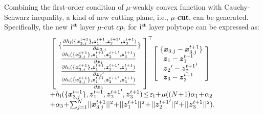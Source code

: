 \documentclass[letterpaper]{article} %
\begin{document}
Combining the first-order condition of $\mu$-weakly convex function with Cauchy-Schwarz inequality, a kind of new cutting plane, i.e., ${\mu}$-\textbf{cut}, can be generated. Specifically, the new ${\rm{\uppercase\expandafter{\romannumeral1}}}^{\rm{st}}$ layer $\mu$-cut ${cp_{\rm{\uppercase\expandafter{\romannumeral1}}}}$ for ${\rm{\uppercase\expandafter{\romannumeral1}}}^{\rm{st}}$ layer polytope can be expressed as:
\begin{equation}
\label{eq:new_inner_cp}
\begin{array}{l}
 {\left[ \! \begin{array}{l}
\{\frac{{\partial h_{\rm{\uppercase\expandafter{\romannumeral1}}}(\{{\boldsymbol{x}_{3,j}^{t+1}}\},\boldsymbol{z}_1^{t+1}, {\boldsymbol{z}_2^{t+1}}',\boldsymbol{z}_3^{t+1} )}}{{\partial {\boldsymbol{x}_{3,j}}}} \}\\
\, \, \frac{{\partial h_{\rm{\uppercase\expandafter{\romannumeral1}}}(\{{\boldsymbol{x}_{3,j}^{t+1}}\},\boldsymbol{z}_1^{t+1}, {\boldsymbol{z}_2^{t+1}}',\boldsymbol{z}_3^{t+1} )}}{{\partial \boldsymbol{z}_1}} \\
\, \,  \frac{{\partial h_{\rm{\uppercase\expandafter{\romannumeral1}}}(\{{\boldsymbol{x}_{3,j}^{t+1}}\},\boldsymbol{z}_1^{t+1}, {\boldsymbol{z}_2^{t+1}}',\boldsymbol{z}_3^{t+1} )}}{{\partial {\boldsymbol{z}_2}'}} \\
\, \,  \frac{{\partial h_{\rm{\uppercase\expandafter{\romannumeral1}}}(\{{\boldsymbol{x}_{3,j}^{t+1}}\},\boldsymbol{z}_1^{t+1}, {\boldsymbol{z}_2^{t+1}}',\boldsymbol{z}_3^{t+1} )}}{{\partial \boldsymbol{z}_3}}
\end{array} \! \right]^{\top}}\! \left[\! \begin{array}{l}
\{ \boldsymbol{x}_{3,j} - \boldsymbol{x}_{3,j}^{t+1} \}\\
\; \,  \boldsymbol{z}_1 - \boldsymbol{z}_1^{t+1}  \\
\; \,  {\boldsymbol{z}_2}' - {\boldsymbol{z}_2^{t+1}}' \\
\; \,  \boldsymbol{z}_3 - \boldsymbol{z}_3^{t+1}
\end{array} \! \right] \\

\!+h_{\rm{\uppercase\expandafter{\romannumeral1}}}(\{{\boldsymbol{x}_{3,j}^{t+1}}\},\boldsymbol{z}_1^{t+1}, {\boldsymbol{z}_2^{t+1}}',\boldsymbol{z}_3^{t+1} )
\! \le \! \varepsilon_{\rm{\uppercase\expandafter{\romannumeral1}}} \! +\! \mu ((N\!+\!1)\alpha_1 \!+ \! \alpha_2
\\
\!+\alpha_3  \!+\! \sum\nolimits_{j = 1}^N \!||\boldsymbol{x}_{3,j}^{t+1}||^2 \!+\! ||\boldsymbol{z}_1^{t+1}||^2 \!+\! ||{\boldsymbol{z}_2^{t+1}}'||^2 \!+\! ||\boldsymbol{z}_3^{t+1}||^2).
\end{array}
\end{equation}
\end{document}

